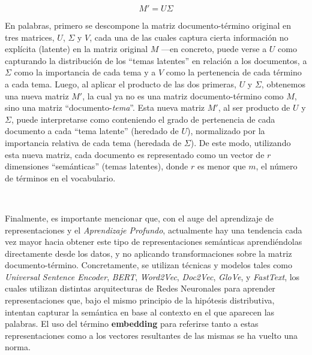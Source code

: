 $$M'=U\Sigma$$

En palabras, primero se descompone la matriz documento-término original en tres matrices, $U$, $\Sigma$ y $V$, cada una de las cuales captura cierta información no explícita (latente) en la matriz original $M$ ---en concreto, puede verse a $U$ como capturando la distribución de los ``temas latentes'' en relación a los documentos, a $\Sigma$ como la importancia de cada tema y a $V$ como la pertenencia de cada término a cada tema.
Luego, al aplicar el producto de las dos primeras, $U$ y $\Sigma$, obtenemos una nueva matriz $M'$, la cual ya no es una matriz documento-término como $M$, sino una matriz ``documento-\emph{tema}''. Esta nueva matriz $M'$, al ser producto de $U$ y $\Sigma$, puede interpretarse como conteniendo el grado de pertenencia de cada documento a cada ``tema latente'' (heredado de $U$), normalizado por la importancia relativa de cada tema (heredada de $\Sigma$).
De este modo, utilizando esta nueva matriz, cada documento es representado como un vector de $r$ dimensiones ``semánticas'' (temas latentes), donde $r$ es menor que $m$, el número de términos en el vocabulario.

\

Finalmente, es importante mencionar que, con el auge del aprendizaje de representaciones y el \emph{Aprendizaje Profundo}, actualmente hay una tendencia cada vez mayor hacia obtener este tipo de representaciones semánticas aprendiéndolas directamente desde los datos, y no aplicando transformaciones sobre la matriz documento-término.
Concretamente, se utilizan técnicas y modelos tales como \emph{Universal Sentence Encoder}\cite{cer2018universal}, \emph{BERT}\cite{devlin2018bert}, \emph{Word2Vec}\cite{goldberg2014word2vec}, \emph{Doc2Vec}\cite{le2014distributed}, \emph{GloVe}\cite{pennington2014glove}, y \emph{FastText}\cite{joulin2016bag}, los cuales utilizan distintas arquitecturas de Redes Neuronales para aprender representaciones que, bajo el mismo principio de la hipótesis distributiva, intentan capturar la semántica en base al contexto en el que aparecen las palabras.
El uso del término \textbf{embedding} para referirse tanto a estas representaciones como a los vectores resultantes de las mismas se ha vuelto una norma.



